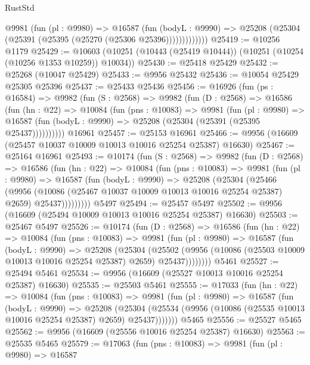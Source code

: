 \begin{lexlean}{RustStd}
\begin{coremodule}
              @9981
                (fun (pl : @9980) =>
                @16587
                  (fun (bodyL : @9990) =>
                  @25208 (@25304 (@25391 (@25395 (@25270 (@25306 @25396)))))))))))))
@25419 := @10256 @1179
@25429 := @10603 (@10251 (@10443 (@25419 @10444)) (@10251 (@10254 (@10256 @1353 @10259)) @10034))
@25430 := @25418 @25429
@25432 := @25268 (@10047 @25429)
@25433 := @9956 @25432
@25436 := @10054 @25429 @25305 @25396
@25437 := @25433 @25436
@25456 := @16926
    (fun (ps : @16584) =>
    @9982
      (fun (S : @2568) =>
      @9982
        (fun (D : @2568) =>
        @16586
          (fun (hn : @22) =>
          @10084
            (fun (pns : @10083) =>
            @9981
              (fun (pl : @9980) =>
              @16587 (fun (bodyL : @9990) => @25208 (@25304 (@25391 (@25395 @25437))))))))))
    @16961
@25457 := @25153 @16961
@25466 := @9956 (@16609 (@25457 @10037 @10009 @10013 @10016 @25254 @25387) @16630)
@25467 := @25164 @16961
@25493 := @10174
    (fun (S : @2568) =>
    @9982
      (fun (D : @2568) =>
      @16586
        (fun (hn : @22) =>
        @10084
          (fun (pns : @10083) =>
          @9981
            (fun (pl : @9980) =>
            @16587
              (fun (bodyL : @9990) =>
              @25208
                (@25304
                  (@25466
                    (@9956
                      (@10086 (@25467 @10037 @10009 @10013 @10016 @25254 @25387) @2659)
                      @25437)))))))))
    @5497
@25494 := @25457 @5497
@25502 := @9956 (@16609 (@25494 @10009 @10013 @10016 @25254 @25387) @16630)
@25503 := @25467 @5497
@25526 := @10174
    (fun (D : @2568) =>
    @16586
      (fun (hn : @22) =>
      @10084
        (fun (pns : @10083) =>
        @9981
          (fun (pl : @9980) =>
          @16587
            (fun (bodyL : @9990) =>
            @25208
              (@25304
                (@25502
                  (@9956 (@10086 (@25503 @10009 @10013 @10016 @25254 @25387) @2659) @25437))))))))
    @5461
@25527 := @25494 @5461
@25534 := @9956 (@16609 (@25527 @10013 @10016 @25254 @25387) @16630)
@25535 := @25503 @5461
@25555 := @17033
    (fun (hn : @22) =>
    @10084
      (fun (pns : @10083) =>
      @9981
        (fun (pl : @9980) =>
        @16587
          (fun (bodyL : @9990) =>
          @25208
            (@25304 (@25534 (@9956 (@10086 (@25535 @10013 @10016 @25254 @25387) @2659) @25437)))))))
    @5465
@25556 := @25527 @5465
@25562 := @9956 (@16609 (@25556 @10016 @25254 @25387) @16630)
@25563 := @25535 @5465
@25579 := @17063
    (fun (pns : @10083) =>
    @9981
      (fun (pl : @9980) =>
      @16587

\end{coremodule}
\end{lexlean}
